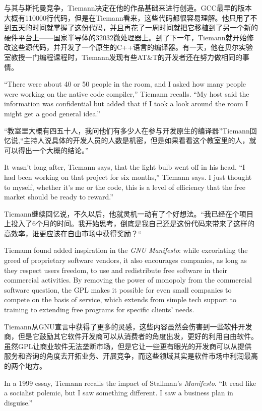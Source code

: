 \ifdefined\chs
与其与斯托曼竞争，Tiemann决定在他的作品基础来进行创造。GCC最早的版本大概有110000行代码，但是在Tiemann看来，这些代码都很容易理解。他只用了不到五天的时间就掌握了这份代码，并且再花了一周时间就把它移植到了另一个新的硬件平台上——国家半导体的32032微处理器上。到了下一年，Tiemann就开始修改这些源代码，并开发了一个原生的C++语言的编译器。有一天，他在贝尔实验室教授一门编程课程时，Tiemann发现有些AT\&T的开发者还在努力做相同的事情。
\fi

\ifdefined\eng
``There were about 40 or 50 people in the room, and I asked how many people were working on the native code compiler,'' Tiemann recalls. ``My host said the information was confidential but added that if I took a look around the room I might get a good general idea.''
\fi

\ifdefined\chs
``教室里大概有四五十人，我问他们有多少人在参与开发原生的编译器''Tiemann回忆说,``主持人说具体的开发人员的人数是机密，但是如果看看这个教室里的人，就可以得出一个大概的结论。''
\fi

\ifdefined\eng
It wasn't long after, Tiemann says, that the light bulb went off in his head. ``I had been working on that project for six months,'' Tiemann says. I just thought to myself, whether it's me or the code, this is a level of efficiency that the free market should be ready to reward.''
\fi

\ifdefined\chs
Tiemann继续回忆说，不久以后，他就灵机一动有了个好想法。``我已经在个项目上投入了6个月的时间。我开始思考，倒底是我自己还是这份代码来带来了这样的高效率，谁更应该在自由市场中获得奖励？``
\fi

\ifdefined\eng
Tiemann found added inspiration in the \textit{GNU Manifesto}: while excoriating the greed of proprietary software vendors, it also encourages companies, as long as they respect users freedom, to use and redistribute free software in their commercial activities. By removing the power of monopoly from the commercial software question, the GPL makes it possible for even small companies to compete on the basis of service, which extends from simple tech support to training to extending free programs for specific clients' needs.
\fi

\ifdefined\chs
Tiemann从GNU宣言中获得了更多的灵感，这些内容虽然会伤害到一些软件开发商，但是它鼓励其它软件开发商可以从消费者的角度出发，更好的利用自由软件。虽然GPL让商业软件无法垄断市场，但是它让一些更有眼光的开发商可以从提供服务和咨询的角度去开拓业务、开展竞争，而这些领域其实是软件市场中利润最高的两个地方。
\fi

\ifdefined\eng
In a 1999 essay, Tiemann recalls the impact of Stallman's \textit{Manifesto}. ``It read like a socialist polemic, but I saw something different. I saw a business plan in disguise.''
\fi


